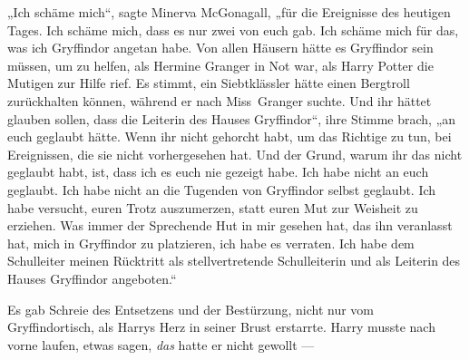 „Ich schäme mich“, sagte Minerva McGonagall, „für die Ereignisse des heutigen Tages. Ich schäme mich, dass es nur zwei von euch gab. Ich schäme mich für das, was ich Gryffindor angetan habe. Von allen Häusern hätte es Gryffindor sein müssen, um zu helfen, als Hermine Granger in Not war, als Harry Potter die Mutigen zur Hilfe rief. Es stimmt, ein Siebtklässler hätte einen Bergtroll zurückhalten können, während er nach Miss~Granger suchte. Und ihr hättet glauben sollen, dass die Leiterin des Hauses Gryffindor“, ihre Stimme brach, „an euch geglaubt hätte. Wenn ihr nicht gehorcht habt, um das Richtige zu tun, bei Ereignissen, die sie nicht vorhergesehen hat. Und der Grund, warum ihr das nicht geglaubt habt, ist, dass ich es euch nie gezeigt habe. Ich habe nicht an euch geglaubt. Ich habe nicht an die Tugenden von Gryffindor selbst geglaubt. Ich habe versucht, euren Trotz auszumerzen, statt euren Mut zur Weisheit zu erziehen. Was immer der Sprechende Hut in mir gesehen hat, das ihn veranlasst hat, mich in Gryffindor zu platzieren, ich habe es verraten. Ich habe dem Schulleiter meinen Rücktritt als stellvertretende Schulleiterin und als Leiterin des Hauses Gryffindor angeboten.“

\later

Es gab Schreie des Entsetzens und der Bestürzung, nicht nur vom Gryffindortisch, als Harrys Herz in seiner Brust erstarrte. Harry musste nach vorne laufen, etwas sagen, \emph{das} hatte er nicht gewollt —

